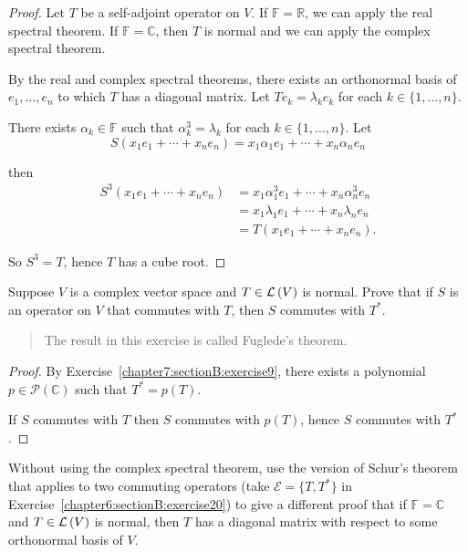 \begin{proof}
    Let $T$ be a self-adjoint operator on $V$. If $\mathbb{F} = \mathbb{R}$, we can apply the real spectral theorem. If $\mathbb{F} = \mathbb{C}$, then $T$ is normal and we can apply the complex spectral theorem.

    By the real and complex spectral theorems, there exists an orthonormal basis of $e_{1}, \ldots, e_{n}$ to which $T$ has a diagonal matrix. Let $Te_{k} = \lambda_{k}e_{k}$ for each $k\in\{ 1,\ldots, n \}$.

    There exists $\alpha_{k}\in\mathbb{F}$ such that $\alpha_{k}^{3} = \lambda_{k}$ for each $k\in\{1,\ldots, n\}$. Let
    \[
        S(x_{1}e_{1} + \cdots + x_{n}e_{n}) = x_{1}\alpha_{1}e_{1} + \cdots + x_{n}\alpha_{n}e_{n}
    \]

    then
    \begin{align*}
        S^{3}(x_{1}e_{1} + \cdots + x_{n}e_{n}) & = x_{1}\alpha_{1}^{3}e_{1} + \cdots + x_{n}\alpha_{n}^{3}e_{n} \\
                                                & = x_{1}\lambda_{1}e_{1} + \cdots + x_{n}\lambda_{n}e_{n}       \\
                                                & = T(x_{1}e_{1} + \cdots + x_{n}e_{n}).
    \end{align*}

    So $S^{3} = T$, hence $T$ has a cube root.
\end{proof}
\newpage

\begin{exercise}
    Suppose $V$ is a complex vector space and $T \in \mathcal{L}\left({V}\right)$ is normal. Prove that if $S$ is an operator on $V$ that commutes with $T$, then $S$ commutes with $T^{*}$.
\end{exercise}

\begin{quote}
    The result in this exercise is called Fuglede's theorem.
\end{quote}

\begin{proof}
    By Exercise~\ref{chapter7:sectionB:exercise9}, there exists a polynomial $p\in\mathscr{P}(\mathbb{C})$ such that $T^{*} = p(T)$.

    If $S$ commutes with $T$ then $S$ commutes with $p(T)$, hence $S$ commutes with $T^{*}$.
\end{proof}
\newpage

\begin{exercise}
    Without using the complex spectral theorem, use the version of Schur's theorem that applies to two commuting operators (take $\mathcal{E} = \{T, T^{*}\}$ in Exercise~\ref{chapter6:sectionB:exercise20}) to give a different proof that if $\mathbb{F} = \mathbb{C}$ and $T \in \mathcal{L}\left({V}\right)$ is normal, then $T$ has a diagonal matrix with respect to some orthonormal basis of $V$.
\end{exercise}

